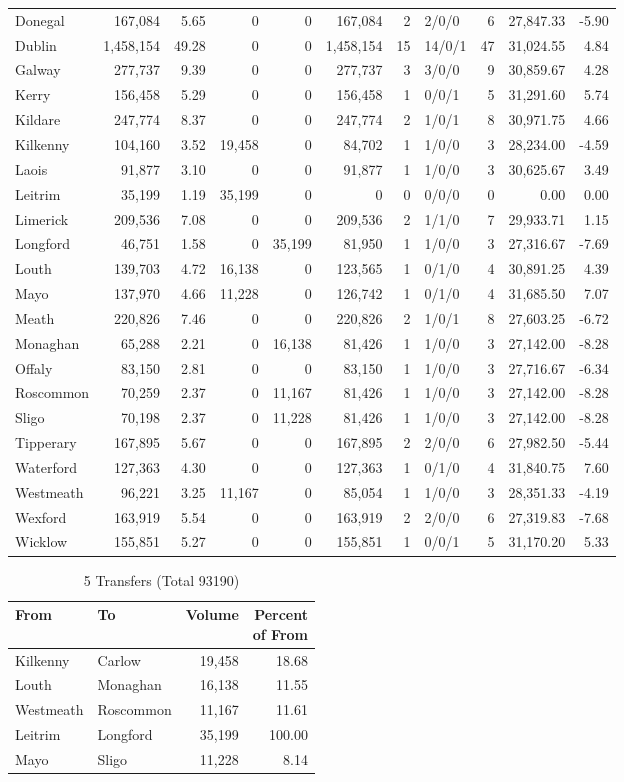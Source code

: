 \documentclass[a4paper]{article}
\begin{document}
\begin{longtable}{lrrrrrrlrrr}
Donegal&167,084& 5.65&0&0&167,084&2&2/0/0&6&27,847.33&-5.90\\ 
Dublin&1,458,154&49.28&0&0&1,458,154&15&14/0/1&47&31,024.55& 4.84\\ 
Galway&277,737& 9.39&0&0&277,737&3&3/0/0&9&30,859.67& 4.28\\ 
Kerry&156,458& 5.29&0&0&156,458&1&0/0/1&5&31,291.60& 5.74\\ 
Kildare&247,774& 8.37&0&0&247,774&2&1/0/1&8&30,971.75& 4.66\\ 
Kilkenny&104,160& 3.52&19,458&0&84,702&1&1/0/0&3&28,234.00&-4.59\\ 
Laois&91,877& 3.10&0&0&91,877&1&1/0/0&3&30,625.67& 3.49\\ 
Leitrim&35,199& 1.19&35,199&0&0&0&0/0/0&0& 0.00& 0.00\\ 
Limerick&209,536& 7.08&0&0&209,536&2&1/1/0&7&29,933.71& 1.15\\ 
Longford&46,751& 1.58&0&35,199&81,950&1&1/0/0&3&27,316.67&-7.69\\ 
Louth&139,703& 4.72&16,138&0&123,565&1&0/1/0&4&30,891.25& 4.39\\ 
Mayo&137,970& 4.66&11,228&0&126,742&1&0/1/0&4&31,685.50& 7.07\\ 
Meath&220,826& 7.46&0&0&220,826&2&1/0/1&8&27,603.25&-6.72\\ 
Monaghan&65,288& 2.21&0&16,138&81,426&1&1/0/0&3&27,142.00&-8.28\\ 
Offaly&83,150& 2.81&0&0&83,150&1&1/0/0&3&27,716.67&-6.34\\ 
Roscommon&70,259& 2.37&0&11,167&81,426&1&1/0/0&3&27,142.00&-8.28\\ 
Sligo&70,198& 2.37&0&11,228&81,426&1&1/0/0&3&27,142.00&-8.28\\ 
Tipperary&167,895& 5.67&0&0&167,895&2&2/0/0&6&27,982.50&-5.44\\ 
Waterford&127,363& 4.30&0&0&127,363&1&0/1/0&4&31,840.75& 7.60\\ 
Westmeath&96,221& 3.25&11,167&0&85,054&1&1/0/0&3&28,351.33&-4.19\\ 
Wexford&163,919& 5.54&0&0&163,919&2&2/0/0&6&27,319.83&-7.68\\ 
Wicklow&155,851& 5.27&0&0&155,851&1&0/0/1&5&31,170.20& 5.33\\ 
\end{longtable}

\begin{table}[htbp]
\caption{5 Transfers (Total 93190)}
\centering
\begin{tabular}{llrr} \toprule
From &To &Volume &\shortstack{Percent\\of From} \\ \midrule
Kilkenny&Carlow&19,458&18.68\\ 
Louth&Monaghan&16,138&11.55\\ 
Westmeath&Roscommon&11,167&11.61\\ 
Leitrim&Longford&35,199&100.00\\ 
Mayo&Sligo&11,228& 8.14\\ 
\bottomrule
\end{tabular}
\end{table}
\end{document}
